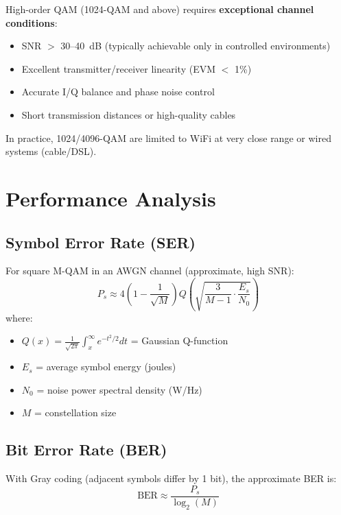 \begin{warningbox}
High-order QAM (1024-QAM and above) requires \textbf{exceptional channel conditions}:
\begin{itemize}
\item SNR $>$ 30--40~dB (typically achievable only in controlled environments)
\item Excellent transmitter/receiver linearity (EVM $<$ 1\%)
\item Accurate I/Q balance and phase noise control
\item Short transmission distances or high-quality cables
\end{itemize}
In practice, 1024/4096-QAM are limited to WiFi at very close range or wired systems (cable/DSL).
\end{warningbox}

\section{Performance Analysis}

\subsection{Symbol Error Rate (SER)}

For square M-QAM in an AWGN channel (approximate, high SNR):
\begin{equation}
P_s \approx 4\left(1 - \frac{1}{\sqrt{M}}\right) Q\left(\sqrt{\frac{3}{M-1} \cdot \frac{E_s}{N_0}}\right)
\label{eq:qam-ser}
\end{equation}
where:
\begin{itemize}
\item $Q(x) = \frac{1}{\sqrt{2\pi}} \int_x^\infty e^{-t^2/2} dt$ = Gaussian Q-function
\item $E_s$ = average symbol energy (joules)
\item $N_0$ = noise power spectral density (W/Hz)
\item $M$ = constellation size
\end{itemize}

\subsection{Bit Error Rate (BER)}

With Gray coding (adjacent symbols differ by 1 bit), the approximate BER is:
\begin{equation}
\text{BER} \approx \frac{P_s}{\log_2(M)}
\label{eq:qam-ber-gray}
\end{equation}

